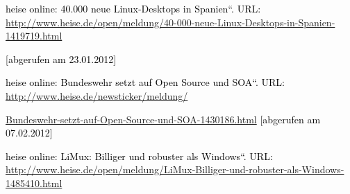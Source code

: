 \documentclass[a4paper]{article}
\newcommand\textstyleInternetlink[1]{\foreignlanguage{english}{\textcolor[rgb]{0.0,0.0,0.5019608}{#1}}}
\begin{document}
{
\textstyleInternetlink{\textcolor{black}{heise online:
{\quotedblbase}}}\textstyleInternetlink{\textcolor{black}{40.000}}\textstyleInternetlink{\textcolor{black}{
}}\textstyleInternetlink{\textcolor{black}{neue}}\textstyleInternetlink{\textcolor{black}{
}}\textstyleInternetlink{\textcolor{black}{Linux-Desktops}}\textstyleInternetlink{\textcolor{black}{
}}\textstyleInternetlink{\textcolor{black}{in}}\textstyleInternetlink{\textcolor{black}{
}}\textstyleInternetlink{\textcolor{black}{Spanien}}\textstyleInternetlink{\textcolor{black}{{\textquotedblleft}}}\textstyleInternetlink{\textcolor{black}{.
URL:
}}\url{http://www.heise.de/open/meldung/40-000-neue-Linux-Desktops-in-Spanien-1419719.html}}

{
\textstyleInternetlink{\textcolor{black}{[abgerufen am 23.01.2012]}}}


\bigskip

{
\textstyleInternetlink{\textcolor{black}{heise online:
{\quotedblbase}}}\textstyleInternetlink{\textcolor{black}{Bundeswehr}}\textstyleInternetlink{\textcolor{black}{
}}\textstyleInternetlink{\textcolor{black}{setzt}}\textstyleInternetlink{\textcolor{black}{
}}\textstyleInternetlink{\textcolor{black}{auf}}\textstyleInternetlink{\textcolor{black}{
}}\textstyleInternetlink{\textcolor{black}{Open}}\textstyleInternetlink{\textcolor{black}{
}}\textstyleInternetlink{\textcolor{black}{Source}}\textstyleInternetlink{\textcolor{black}{
}}\textstyleInternetlink{\textcolor{black}{und}}\textstyleInternetlink{\textcolor{black}{
}}\textstyleInternetlink{\textcolor{black}{SOA}}\textstyleInternetlink{\textcolor{black}{{\textquotedblleft}}}\textstyleInternetlink{\textcolor{black}{.
URL:
}}\href{http://www.heise.de/newsticker/meldung/Bundeswehr-setzt-auf-Open-Source-und-SOA-1430186.html}{\textstyleInternetlink{http://www.heise.de/newsticker/meldung/}}}

{
\href{http://www.heise.de/newsticker/meldung/Bundeswehr-setzt-auf-Open-Source-und-SOA-1430186.html}{\textstyleInternetlink{Bundeswehr-setzt-auf-Open-Source-und-SOA-1430186.html}}\textstyleInternetlink{\textcolor{black}{
}}\foreignlanguage{english}{\textcolor{black}{[abgerufen am
07.02.2012]}}}


\bigskip

{
\textstyleInternetlink{\textcolor{black}{heise online:
{\quotedblbase}}}\textstyleInternetlink{\textcolor{black}{LiMux:}}\textstyleInternetlink{\textcolor{black}{
}}\textstyleInternetlink{\textcolor{black}{Billiger}}\textstyleInternetlink{\textcolor{black}{
}}\textstyleInternetlink{\textcolor{black}{und}}\textstyleInternetlink{\textcolor{black}{
}}\textstyleInternetlink{\textcolor{black}{robuster}}\textstyleInternetlink{\textcolor{black}{
}}\textstyleInternetlink{\textcolor{black}{als}}\textstyleInternetlink{\textcolor{black}{
}}\textstyleInternetlink{\textcolor{black}{Windows}}\textstyleInternetlink{\textcolor{black}{{\textquotedblleft}}}\textstyleInternetlink{\textcolor{black}{.
URL:
}}\url{http://www.heise.de/open/meldung/LiMux-Billiger-und-robuster-als-Windows-1485410.html}}
\end{document}
